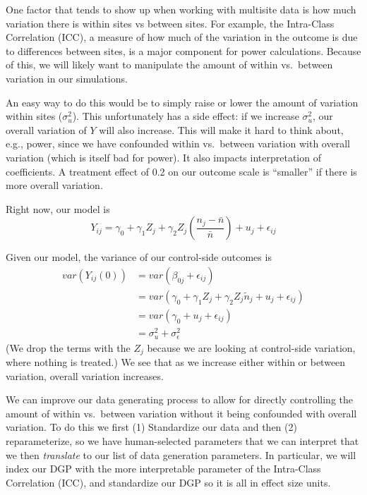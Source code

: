 \documentclass[
]{book}
\begin{document}
One factor that tends to show up when working with multisite data is how much variation there is within sites vs between sites.
For example, the Intra-Class Correlation (ICC), a measure of how much of the variation in the outcome is due to differences between sites, is a major component for power calculations.
Because of this, we will likely want to manipulate the amount of within vs.~between variation in our simulations.

An easy way to do this would be to simply raise or lower the amount of variation within sites (\(\sigma^2_u\)).
This unfortunately has a side effect: if we increase \(\sigma^2_u\), our overall variation of \(Y\) will also increase.
This will make it hard to think about, e.g., power, since we have confounded within vs.~between variation with overall variation (which is itself bad for power).
It also impacts interpretation of coefficients.
A treatment effect of 0.2 on our outcome scale is ``smaller'' if there is more overall variation.

Right now, our model is
\[ Y_{ij} = \gamma_{0} + \gamma_{1} Z_j + \gamma_2 Z_j \left(\frac{n_j - \bar{n}}{\bar{n}} \right)  + u_j + \epsilon_{ij}  \]

Given our model, the variance of our control-side outcomes is
\[ 
\begin{aligned}
var( Y_{ij}(0) ) &= var( \beta_{0j} + \epsilon_{ij} ) \\
&= var( \gamma_{0} + \gamma_{1} Z_j + \gamma_{2}Z_j \tilde{n}_j + u_j + \epsilon_{ij} ) \\
&= var( \gamma_{0} + u_j + \epsilon_{ij} ) \\
&= \sigma^2_u + \sigma^2_\epsilon
\end{aligned}
\]
(We drop the terms with the \(Z_j\) because we are looking at control-side variation, where nothing is treated.)
We see that as we increase either within or between variation, overall variation increases.

We can improve our data generating process to allow for directly controlling the amount of within vs.~between variation without it being confounded with overall variation.
To do this we first (1) Standardize our data and then (2) reparameterize, so we have human-selected parameters that we can interpret that we then \emph{translate} to our list of data generation parameters.
In particular, we will index our DGP with the more interpretable parameter of the Intra-Class Correlation (ICC), and standardize our DGP so it is all in effect size units.
\end{document}
